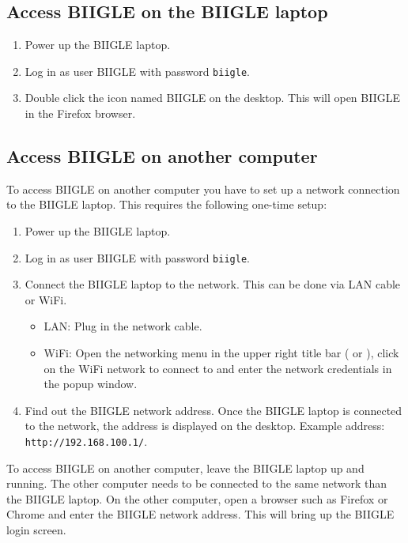 



\subsection*{Access BIIGLE on the BIIGLE laptop}

\begin{enumerate}
	\item Power up the BIIGLE laptop.
	\item Log in as user BIIGLE with password \texttt{biigle}.
	\item Double click the icon named BIIGLE on the desktop. This will open BIIGLE in the Firefox browser.
\end{enumerate}

\subsection*{Access BIIGLE on another computer}

To access BIIGLE on another computer you have to set up a network connection to the BIIGLE laptop. This requires the following one-time setup:

\begin{enumerate}
	\item Power up the BIIGLE laptop.
	\item Log in as user BIIGLE with password \texttt{biigle}.
	\item Connect the BIIGLE laptop to the network. This can be done via LAN cable or WiFi. \begin{itemize}
		\item LAN: Plug in the network cable.
		\item WiFi: Open the networking menu in the upper right title bar ( or ), click on the WiFi network to connect to and enter the network credentials in the popup window.
	\end{itemize}
	\item Find out the BIIGLE network address. Once the BIIGLE laptop is connected to the network, the address is displayed on the desktop. Example address: \texttt{http://192.168.100.1/}.
\end{enumerate}

To access BIIGLE on another computer, leave the BIIGLE laptop up and running. The other computer needs to be connected to the same network than the BIIGLE laptop. On the other computer, open a browser such as Firefox or Chrome and enter the BIIGLE network address. This will bring up the BIIGLE login screen.

